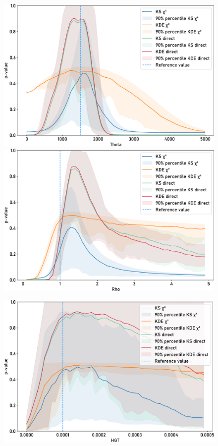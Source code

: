 \begin{figure}[h]
    \centering
    \begin{minipage}{0.49\textwidth}
        \includegraphics[width=\textwidth]{figures/neutrality_test/hgt_0.0001_theta.pdf}\\
        \includegraphics[width=\textwidth]{figures/neutrality_test/hgt_0.0001_rho.pdf}
    \end{minipage}
    \begin{minipage}{0.49\textwidth}
        \includegraphics[width=\textwidth]{figures/neutrality_test/hgt_0.0001_hgt.pdf}\\ %

\end{minipage}
\end{figure}
